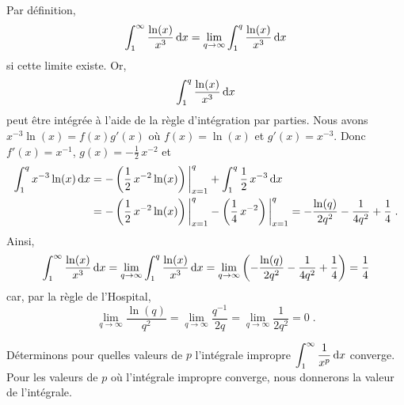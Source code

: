 {\begin{egg}
Par définition,
\[
\int_1^\infty \frac{\ln(x)}{x^3} \,\mathrm{d}x =
\lim_{q\rightarrow \infty} \int_1^q \frac{\ln(x)}{x^3} \,\mathrm{d}x
\]
si cette limite existe.  Or,
\[
\int_1^q \frac{\ln(x)}{x^3} \,\mathrm{d}x
\]
peut être intégrée à l'aide de la règle d'intégration par parties.
Nous avons $x^{-3} \ln(x) = f(x)g'(x)$ où $f(x) = \ln(x)$ et $g'(x) = x^{-3}$.
Donc $f'(x) = x^{-1}$, $g(x) = -\frac{1}{2}\, x^{-2}$ et 
\begin{align*}
\int_1^q x^{-3} \ln(x) \,\mathrm{d}x
&= -\left(\frac{1}{2}\, x^{-2} \ln(x)\right)\bigg|_{x=1}^q
+ \int_1^q \frac{1}{2}\, x^{-3} \,\mathrm{d}x \\
&= -\left(\frac{1}{2}\, x^{-2} \ln(x)\right)\bigg|_{x=1}^q
- \left(\frac{1}{4}\, x^{-2} \right)\bigg|_{x=1}^q
= -\frac{\ln(q)}{2q^{2}}  - \frac{1}{4q^{2}} +\frac{1}{4} \; .
\end{align*}
Ainsi,
\[
\int_1^\infty \frac{\ln(x)}{x^3} \,\mathrm{d}x =
\lim_{q\rightarrow \infty} \int_1^q \frac{\ln(x)}{x^3} \,\mathrm{d}x
= \lim_{q\rightarrow \infty}
\left(-\frac{\ln(q)}{2q^{2}}  - \frac{1}{4q^{2}} + \frac{1}{4} \right)
= \frac{1}{4}
\]
car, par la règle de l'Hospital,
\[
\lim_{q\rightarrow \infty} \frac{\ln(q)}{q^2}
= \lim_{q\rightarrow \infty} \frac{q^{-1}}{2q}
= \lim_{q\rightarrow \infty} \frac{1}{2q^2} = 0 \; .
\]
\end{egg}

Déterminons pour quelles valeurs de $p$ l'intégrale impropre
$\displaystyle \int_1^\infty \frac{1}{x^p} \,\mathrm{d}x$ converge.  Pour les
valeurs de $p$ où l'intégrale impropre converge, nous donnerons la
valeur de l'intégrale.

}
